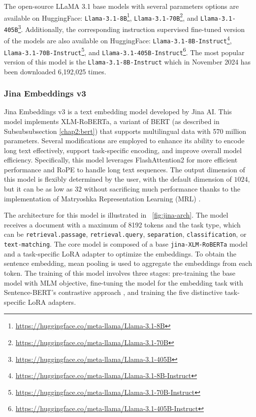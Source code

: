 The open-source LLaMA 3.1 base models with several parameters options are available on HuggingFace: \texttt{Llama-3.1-8B}\footnote{\url{https://huggingface.co/meta-llama/Llama-3.1-8B}}, \texttt{Llama-3.1-70B}\footnote{\url{https://huggingface.co/meta-llama/Llama-3.1-70B}}, and \texttt{Llama-3.1-405B}\footnote{\url{https://huggingface.co/meta-llama/Llama-3.1-405B}}. Additionally, the corresponding instruction supervised fine-tuned version of the models are also available on HuggingFace: \texttt{Llama-3.1-8B-Instruct}\footnote{\url{https://huggingface.co/meta-llama/Llama-3.1-8B-Instruct}}, \texttt{Llama-3.1-70B-Instruct}\footnote{\url{https://huggingface.co/meta-llama/Llama-3.1-70B-Instruct}}, and \texttt{Llama-3.1-405B-Instruct}\footnote{\url{https://huggingface.co/meta-llama/Llama-3.1-405B-Instruct}}. The most popular version of this model is the \texttt{Llama-3.1-8B-Instruct} which in November 2024 has been downloaded 6,192,025 times.

\subsubsection{Jina Embeddings v3}
Jina Embeddings v3 \citep{sturua2024jinaembeddingsv3multilingualembeddingstask} is a text embedding model developed by Jina AI. This model implements XLM-RoBERTa, a variant of BERT (as described in Subsubsubsection \ref{chap2:bert}) that supports multilingual data with 570 million parameters. Several modifications are employed to enhance its ability to encode long text effectively, support task-specific encoding, and improve overall model efficiency. Specifically, this model leverages FlashAttention2 \citep{dao2023flashattention2fasterattentionbetter} for more efficient performance and RoPE \citep{su2024} to handle long text sequences. The output dimension of this model is flexibly determined by the user, with the default dimension of $1024$, but it can be as low as $32$ without sacrificing much performance thanks to the implementation of Matryoshka Representation Learning (MRL) \citep{kusupati2024}.

The architecture for this model is illustrated in \pic~\ref{fig:jina-arch}. The model receives a document with a maximum of 8192 tokens and the task type, which can be \texttt{retrieval.passage}, \texttt{retrieval.query}, \texttt{separation}, \texttt{classification}, or \texttt{text-matching}. The core model is composed of a base \texttt{jina-XLM-RoBERTa} model and a task-specific LoRA \citep{hu2021loralowrankadaptationlarge} adapter to optimize the embeddings. To obtain the sentence embedding, mean pooling is used to aggregate the embeddings from each token. The training of this model involves three stages: pre-training the base model with MLM objective, fine-tuning the model for the embedding task with Sentence-BERT's contrastive approach \citep{reimers-2019-sentence-bert}, and training the five distinctive task-specific LoRA adapters. 

